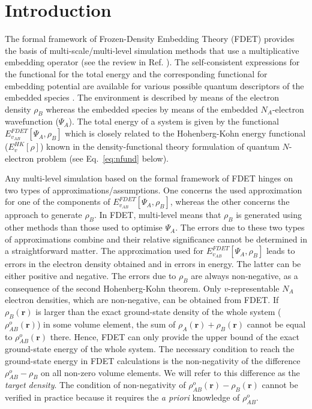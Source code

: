 \documentclass[amsmath,amssymb,preprint,aip,jcp]{revtex4-1}
\begin{document}
\section{Introduction}\label{sec:intro}
The formal framework of 
Frozen-Density Embedding Theory (FDET) provides the basis of multi-scale/multi-level simulation methods that use a multiplicative embedding operator (see the review in Ref. ).  The self-consistent expressions for the functional for the total energy and the corresponding functional for embedding potential are available for various possible quantum descriptors of the embedded species \cite{Wesolowski1993,Wesolowski2008,Pernal2009,Wesolowski2020}. 
The environment is described by means of the electron density $\rho_B$ whereas the embedded species by means of the 
embedded $N_A$-electron wavefunction ($\Psi_A$). The total energy of a system is given by the functional ${E}_{v_{AB}}^{FDET}[\Psi_{A},\rho_B]$ which is closely related to the Hohenberg-Kohn energy functional ($E_v^{HK}[\rho]$) known in the density-functional theory \cite{Hohenberg1964} formulation of quantum $N$-electron problem (see Eq.~\ref{eq:nfund} below).

Any multi-level simulation based on the formal framework of FDET
hinges on two types of approximations/assumptions.
One concerns the used approximation for one of the components of ${E}_{v_{AB}}^{FDET}[\Psi_{A},\rho_B]$, whereas the other concerns the approach to generate $\rho_B$. In FDET, multi-level means that $\rho_B$ is generated using other methods than those used to optimise $\Psi_A$. The errors due to these two types of approximations combine and their relative significance cannot be determined in a straightforward matter. The approximation used for ${E}_{v_{AB}}^{FDET}[\Psi_{A},\rho_B]$ leads to errors in the electron density obtained and in errors in energy. The latter can be either positive and negative. The errors due to $\rho_B$ are always non-negative, as a consequence of the second Hohenberg-Kohn theorem.
Only $v$-representable $N_A$ electron densities, which are non-negative,  can be obtained from FDET. 
If $\rho_B(\mathbf{r})$ is larger than the exact ground-state density of the whole system ($\rho_{AB}^o(\mathbf{r})$) 
in some volume element, the sum of $\rho_A(\mathbf{r})+\rho_B(\mathbf{r})$ cannot be equal to $\rho_{AB}^o(\mathbf{r})$ there. Hence, FDET can only provide the upper bound of the exact ground-state energy of the whole system. The necessary condition to reach the ground-state energy in FDET calculations is the non-negativity of the difference $\rho_{AB}^o-\rho_B$ on all non-zero volume elements.
We will refer to this difference as the {\it target density}.
The condition of non-negativity of $\rho_{AB}^o(\mathbf{r})-\rho_B(\mathbf{r})$ cannot be verified in practice because it requires the {\it a priori} knowledge of 
$\rho_{AB}^o$.
\end{document}

